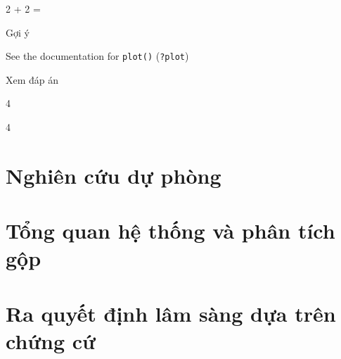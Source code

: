 \documentclass[
]{book}
\newenvironment{Shaded}{\begin{snugshade}}{\end{snugshade}}
\newcommand{\DecValTok}[1]{\textcolor[rgb]{0.00,0.00,0.81}{#1}}
\begin{document}
2 + 2 =

Gợi ý

See the documentation for \texttt{plot()} (\texttt{?plot})

Xem đáp án

4

\begin{Shaded}
\begin{Highlighting}[]
\DecValTok{4}
\end{Highlighting}
\end{Shaded}

\hypertarget{prevention}{%
\chapter{Nghiên cứu dự phòng}\label{prevention}}

\hypertarget{srma}{%
\chapter{Tổng quan hệ thống và phân tích gộp}\label{srma}}

\hypertarget{mdm}{%
\chapter{Ra quyết định lâm sàng dựa trên chứng cứ}\label{mdm}}

  
\end{document}

